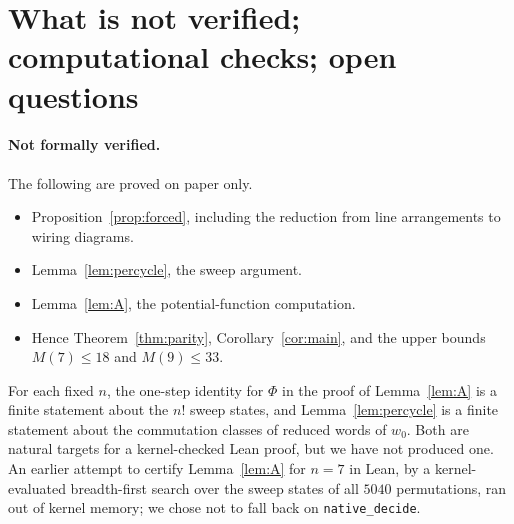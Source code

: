 \section{What is not verified; computational checks; open questions}\label{sec:limitations}

\paragraph{Not formally verified.}
The following are proved on paper only.
\begin{itemize}
\item Proposition~\ref{prop:forced}, including the reduction from line arrangements to wiring diagrams.
\item Lemma~\ref{lem:percycle}, the sweep argument.
\item Lemma~\ref{lem:A}, the potential-function computation.
\item Hence Theorem~\ref{thm:parity}, Corollary~\ref{cor:main}, and the upper bounds $M(7)\le18$ and $M(9)\le33$.
\end{itemize}
For each fixed $n$, the one-step identity for $\Phi$ in the proof of Lemma~\ref{lem:A} is a finite
statement about the $n!$ sweep states, and Lemma~\ref{lem:percycle} is a finite statement about the
commutation classes of reduced words of $w_0$. Both are natural targets for a kernel-checked Lean proof,
but we have not produced one. An earlier attempt to certify Lemma~\ref{lem:A} for $n=7$ in Lean, by a
kernel-evaluated breadth-first search over the sweep states of all $5040$ permutations, ran out of kernel
memory; we chose not to fall back on \texttt{native\_decide}.

